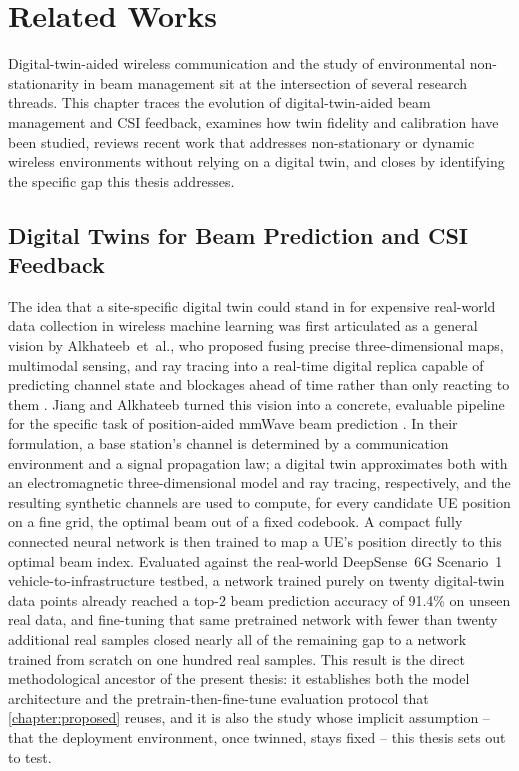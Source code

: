 \documentclass{iutbscthesis}
\begin{document}
\chapter{Related Works}
\label{chapter:related}

Digital-twin-aided wireless communication and the study of environmental non-stationarity in beam management sit at the intersection of several research threads. This chapter traces the evolution of digital-twin-aided beam management and CSI feedback, examines how twin fidelity and calibration have been studied, reviews recent work that addresses non-stationary or dynamic wireless environments without relying on a digital twin, and closes by identifying the specific gap this thesis addresses.

\section{Digital Twins for Beam Prediction and CSI Feedback}

The idea that a site-specific digital twin could stand in for expensive real-world data collection in wireless machine learning was first articulated as a general vision by Alkhateeb~et~al., who proposed fusing precise three-dimensional maps, multimodal sensing, and ray tracing into a real-time digital replica capable of predicting channel state and blockages ahead of time rather than only reacting to them \cite{alkhateeb2023realtime}. Jiang and Alkhateeb turned this vision into a concrete, evaluable pipeline for the specific task of position-aided mmWave beam prediction \cite{jiang2023digitaltwinbeam}. In their formulation, a base station's channel is determined by a communication environment and a signal propagation law; a digital twin approximates both with an electromagnetic three-dimensional model and ray tracing, respectively, and the resulting synthetic channels are used to compute, for every candidate UE position on a fine grid, the optimal beam out of a fixed codebook. A compact fully connected neural network is then trained to map a UE's position directly to this optimal beam index. Evaluated against the real-world DeepSense~6G Scenario~1 vehicle-to-infrastructure testbed, a network trained purely on twenty digital-twin data points already reached a top-2 beam prediction accuracy of 91.4\% on unseen real data, and fine-tuning that same pretrained network with fewer than twenty additional real samples closed nearly all of the remaining gap to a network trained from scratch on one hundred real samples. This result is the direct methodological ancestor of the present thesis: it establishes both the model architecture and the pretrain-then-fine-tune evaluation protocol that \autoref{chapter:proposed} reuses, and it is also the study whose implicit assumption -- that the deployment environment, once twinned, stays fixed -- this thesis sets out to test.
\end{document}
